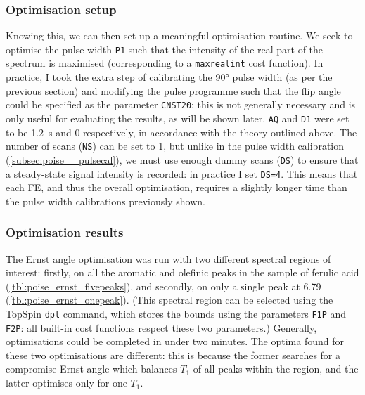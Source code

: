 \subsubsection{Optimisation setup}

Knowing this, we can then set up a meaningful optimisation routine.
We seek to optimise the pulse width \texttt{P1} such that the intensity of the real part of the spectrum is maximised (corresponding to a \texttt{maxrealint} cost function).
In practice, I took the extra step of calibrating the \ang{90} pulse width (as per the previous section) and modifying the pulse programme such that the flip angle could be specified as the parameter \texttt{CNST20}: this is not generally necessary and is only useful for evaluating the results, as will be shown later.
\texttt{AQ} and \texttt{D1} were set to be \qty{1.2}{\s} and 0 respectively, in accordance with the theory outlined above.
The number of scans (\texttt{NS}) can be set to 1, but unlike in the pulse width calibration (\cref{subsec:poise__pulsecal}), we must use enough dummy scans (\texttt{DS}) to ensure that a steady-state signal intensity is recorded: in practice I set \texttt{DS=4}.
This means that each FE, and thus the overall optimisation, requires a slightly longer time than the pulse width calibrations previously shown.


\subsubsection{Optimisation results}

The Ernst angle optimisation was run with two different spectral regions of interest: firstly, on all the aromatic and olefinic peaks in the sample of ferulic acid (\cref{tbl:poise_ernst_fivepeaks}), and secondly, on only a single peak at \qty{6.79}{\ppm} (\cref{tbl:poise_ernst_onepeak}).
(This spectral region can be selected using the TopSpin \texttt{dpl} command, which stores the bounds using the parameters \texttt{F1P} and \texttt{F2P}: all built-in cost functions respect these two parameters.)
Generally, optimisations could be completed in under two minutes.
The optima found for these two optimisations are different: this is because the former searches for a compromise Ernst angle which balances $T_1$ of all peaks within the region, and the latter optimises only for one $T_1$.

